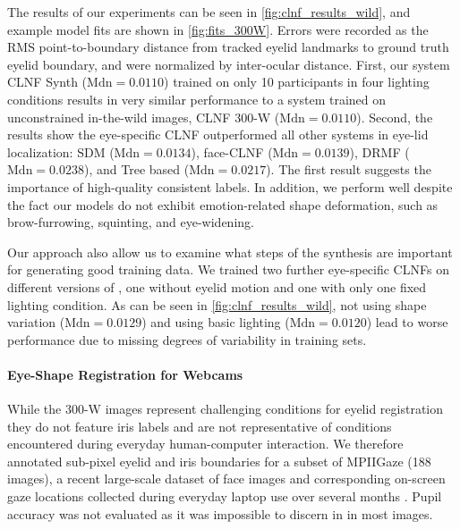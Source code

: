 The results of our experiments can be seen in \autoref{fig:clnf_results_wild}, and example model fits are shown in \autoref{fig:fits_300W}.
Errors were recorded as the RMS point-to-boundary distance from tracked eyelid landmarks to ground truth eyelid boundary, and were normalized by inter-ocular distance. 
%
First, our system CLNF Synth ($\mathrm{Mdn}=0.0110$) trained on only 10 participants in four lighting conditions results in very similar performance to a system trained on unconstrained in-the-wild images, CLNF 300-W ($\mathrm{Mdn}=0.0110$).
%
Second, the results show the eye-specific CLNF outperformed all other systems in eye-lid localization: SDM ($\mathrm{Mdn}=0.0134$), face-CLNF ($\mathrm{Mdn}=0.0139$), DRMF ($\mathrm{Mdn}=0.0238$), and Tree based ($\mathrm{Mdn}=0.0217$). 
The first result suggests the importance of high-quality consistent labels. In addition, we perform well despite the fact our models do not exhibit emotion-related shape deformation, such as brow-furrowing, squinting, and eye-widening.

Our approach also allow us to examine what steps of the synthesis are important for generating good training data. We trained two further eye-specific CLNFs on different versions of \dataset, one without eyelid motion and one with only one fixed lighting condition. As can be seen in \autoref{fig:clnf_results_wild}, not using shape variation ($\mathrm{Mdn}=0.0129$) and using basic lighting ($\mathrm{Mdn}=0.0120$) lead to worse performance due to missing degrees of variability in training sets.

\paragraph{Eye-Shape Registration for Webcams}




While the 300-W images represent challenging conditions for eyelid registration they do not feature iris labels and are not representative of conditions encountered during everyday human-computer interaction.
We therefore annotated sub-pixel eyelid and iris boundaries for a subset of MPIIGaze \cite{zhang15_cvpr} (188 images), a recent large-scale dataset of face images and corresponding on-screen gaze locations collected during everyday laptop use over several months \cite{zhang15_cvpr}.
Pupil accuracy was not evaluated as it was impossible to discern in in most images.

